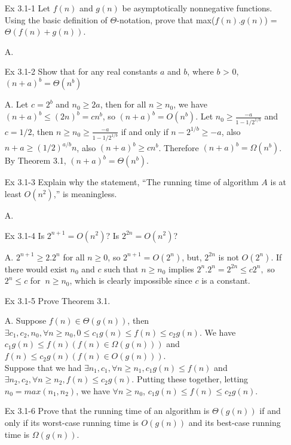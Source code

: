 \documentclass[fontsize=12pt,paper=a4]{book}
\begin{document}
\begin{enumerate}
	\item[Ex 3.1-1]
		Let $f(n)$ and $g(n)$ be asymptotically nonnegative functions. Using the basic definition of $\Theta$-notation, prove that max($f(n).g(n)$) = $\Theta(f(n)+g(n))$.
	\item[A.]
	
	\item[Ex 3.1-2]
	Show that for any real constants $a$ and $b$, where $b$ > 0,\\
	$(n+a)^b = \Theta(n^b)$
	\item[A.]
	Let $c = 2^b$ and $n_0 \geq 2a$, then for all $n \geq n_0$, we have $(n+a)^b \leq (2n)^b = cn^b$, so $(n+a)^b = O(n^b)$. Let $n_0 \geq \frac{-a}{1-1/2^{1/b}}$ and $c = 1/2$, then $n \geq n_0 \geq \frac{-a}{1-1/2^{1/b}}$ if and only if $n-2^{1/b} \geq -a$, also $n+a \geq (1/2)^{a/b}n$, also $(n+a)^b \geq cn^b$. Therefore $(n+a)^b = \Omega(n^b)$. By Theorem 3.1, $(n+a)^b = \Theta(n^b)$.
	
	\item[Ex 3.1-3]
		Explain why the statement, “The running time of algorithm $A$ is at least $O(n^2)$,” is meaningless.
	\item[A.]
	
	\item[Ex 3.1-4]
		Is $2^{n+1} = O(n^2)$? Is $2^{2n} = O(n^2)$?
	\item[A.]
	$2^{n+1} \geq 2 . 2^n$ for all $n \geq 0$, so $2^{n+1} = O(2^n)$, but, $2^{2n}$ is not $O(2^n)$. If there would exist $n_0$ and $c$ such that $n \geq n_0$ implies $2^n . 2^n = 2^{2n} \leq c2^n,$ so $2^n \leq c$ for $\ n \geq n_0$, which is clearly impossible since $c$ is a constant.
	
	\item[Ex 3.1-5]
		Prove Theorem 3.1.
	\item[A.]
	Suppose $f(n) \in \Theta(g(n))$, then $\exists c_1, c_2, n_0, \forall n \geq n_0, 0 \leq c_1g(n) \leq f(n) \leq c_2g(n)$. We have $c_1g(n) \leq f(n)(f(n) \in \Omega(g(n)))$ and $f(n) \leq c_2g(n)(f(n) \in O(g(n)))$.\\
	Suppose that we had $\exists n_1, c_1, \forall n \geq n_1, c_1g(n) \leq f(n)$ and $\exists n_2,c_2,\forall n \geq n_2, f(n) \leq c_2g(n)$. Putting these together, letting $n_0 = max(n_1,n_2)$, we have $\forall n \geq n_0$, $c_1g(n) \leq f(n) \leq c_2g(n)$.

	\item[Ex 3.1-6]
	Prove that the running time of an algorithm is $\Theta(g(n))$ if and only if its worst-case running time is $O(g(n))$ and its best-case running time is $\Omega(g(n))$.
	

\end{enumerate}
\end{document}
